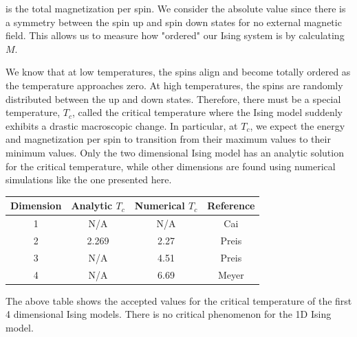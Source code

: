 \documentclass[a4paper]{article}
\begin{document}
is the total magnetization per spin. We consider the absolute value since there is a symmetry between the spin up and spin down states for no external magnetic field. This allows us to measure how "ordered" our Ising system is by calculating $M$.
\par
We know that at low temperatures, the spins align and become totally ordered as the temperature approaches zero. At high temperatures, the spins are randomly distributed between the up and down states.  Therefore, there must be a special temperature, $T_{c}$, called the critical temperature where the Ising model suddenly exhibits a drastic macroscopic change. In particular, at $T_{c}$, we expect the energy and magnetization per spin to transition from their maximum values to their minimum values.  Only the two dimensional Ising model has an analytic solution for the critical temperature, while other dimensions are found using numerical simulations like the one presented here.

\begin{center}
	\begin{tabular}{||c c c c||} 
		\hline
		Dimension & Analytic $T_{c}$ & Numerical $T_{c}$ & Reference \\ [0.5ex] 
		\hline\hline
		1 & N/A & N/A & Cai \\ 
		\hline
		2 & 2.269 & 2.27 & Preis \\
		\hline
		3 & N/A & 4.51 & Preis \\
		\hline
		4 & N/A & 6.69 & Meyer \\ [1ex] 
		\hline
	\end{tabular}
\end{center}
The above table shows the accepted values for the critical temperature of the first 4 dimensional Ising models. There is no critical phenomenon for the 1D Ising model.
\end{document}
